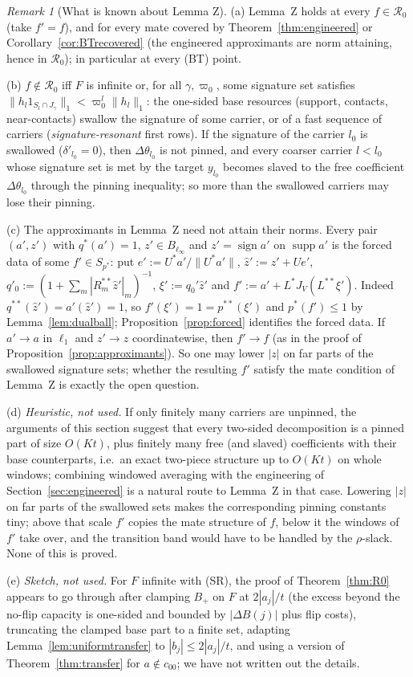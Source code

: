 \documentclass[10pt]{amsart}
\theoremstyle{definition}
\theoremstyle{remark}
\newtheorem{remark}[theorem]{Remark}
\newcommand{\supp}{\operatorname{supp}}
\newcommand{\sgn}{\operatorname{sign}}
\newcommand{\zh}{\hat z}
\begin{document}
\begin{remark}[What is known about Lemma Z]\label{rem:lemmaZ}
(a) Lemma~Z holds at every $f\in\mathcal R_0$ (take $f'=f$), and for every
mate covered by Theorem~\ref{thm:engineered} or
Corollary~\ref{cor:BTrecovered} (the engineered approximants are norm
attaining, hence in $\mathcal R_0$); in particular at every \textup{(BT)}
point.

(b) $f\notin\mathcal R_0$ iff $F$ is infinite or, for all $\gamma,\varpi_0$,
some signature set satisfies $\|h_l1_{S_l\cap J_\gamma}\|_1<\varpi_0^l
\|h_l\|_1$: the one-sided base resources (support, contacts,
near-contacts) swallow the signature of some carrier, or of a fast sequence
of carriers (\emph{signature-resonant} first rows).  If the signature of the
carrier $l_0$ is swallowed ($\delta'_{l_0}=0$), then $\Delta\theta_{l_0}$ is not
pinned, and every coarser carrier $l<l_0$ whose signature set is met by the
target $y_{l_0}$ becomes slaved to the free coefficient $\Delta\theta_{l_0}$
through the pinning inequality; so more than the swallowed carriers may
lose their pinning.

(c) The approximants in Lemma~Z need not attain their norms.  Every pair
$(a',z')$ with $q^*(a')=1$, $z'\in B_{\ell_\infty}$ and $z'=\sgn a'$ on
$\supp a'$ is the forced data of some $f'\in S_{p^*}$: put
$e':=U^*a'/\|U^*a'\|$, $\zh':=z'+Ue'$, $q'_0:=(1+\sum_m|R^{**}_m\zh'|_m)^{-1}$,
$\xi':=q_0'\zh'$ and $f':=a'+L^*J_V(L^{**}\xi')$.  Indeed $q^{**}(\zh')=
a'(\zh')=1$, so $f'(\xi')=1=p^{**}(\xi')$ and $p^*(f')\le1$ by
Lemma~\ref{lem:dualball}; Proposition~\ref{prop:forced} identifies the
forced data.  If $a'\to a$ in $\ell_1$ and $z'\to z$ coordinatewise, then
$f'\to f$ (as in the proof of Proposition~\ref{prop:approximants}).  So one
may lower $|z|$ on far parts of the swallowed signature sets; whether the
resulting $f'$ satisfy the mate condition of Lemma~Z is exactly the open
question.

(d) \emph{Heuristic, not used.}  If only finitely many carriers are unpinned,
the arguments of this section suggest that every two-sided decomposition is a
pinned part of size $O(Kt)$, plus finitely many free (and slaved)
coefficients with their base counterparts, i.e.\ an exact two-piece
structure up to $O(Kt)$ on whole windows; combining windowed averaging with
the engineering of Section~\ref{sec:engineered} is a natural route to
Lemma~Z in that case.  Lowering $|z|$ on far parts of the swallowed sets
makes the corresponding pinning constants tiny; above that scale $f'$
copies the mate structure of $f$, below it the windows of $f'$ take over,
and the transition band would have to be handled by the $\rho$-slack.
None of this is proved.

(e) \emph{Sketch, not used.}  For $F$ infinite with (SR), the proof of
Theorem~\ref{thm:R0} appears to go through after clamping $B_+$ on $F$ at
$2|a_j|/t$ (the excess beyond the no-flip capacity is one-sided and bounded
by $|\Delta B(j)|$ plus flip costs), truncating the clamped base part to a
finite set, adapting Lemma~\ref{lem:uniformtransfer} to $|b_j|\le2|a_j|/t$,
and using a version of Theorem~\ref{thm:transfer} for $a\notin c_{00}$; we
have not written out the details.
\end{remark}
\end{document}
